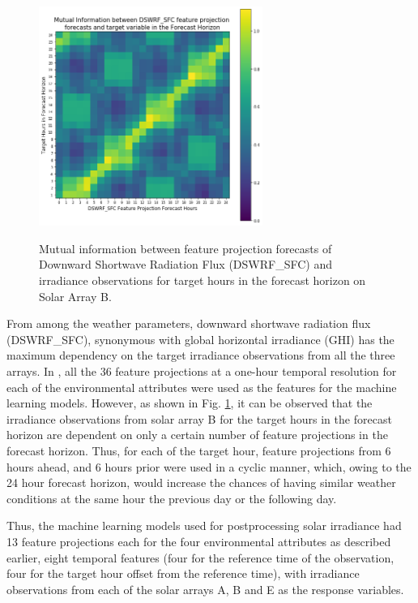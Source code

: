 \begin{figure}[htbp]
    \begin{center}
    	\includegraphics[width=0.65\textwidth]{chapter3/fig_mi_forecast_target.png}
    	\label{fig:fig_mi_forecast_target}
    	\caption[Mutual information between Downward Shortwave Radiation Flux feature projection forecasts and irradiance observations for target hours in the forecast horizon from Solar Array B]{Mutual information between feature projection forecasts of Downward Shortwave Radiation Flux (DSWRF\_SFC) and irradiance observations for target hours in the forecast horizon on Solar Array B.}
    \end{center}
\end{figure}

From among the weather parameters, downward shortwave radiation flux (DSWRF\_SFC), synonymous with global horizontal irradiance (GHI) has the maximum dependency on the target irradiance observations from all the three arrays. In \cite{thesis_zach}, all the 36 feature projections at a one-hour temporal resolution for each of the environmental attributes were used as the features for the machine learning models. However, as shown in Fig. \ref{fig:fig_mi_forecast_target}, it can be observed that the irradiance observations from solar array B for the target hours in the forecast horizon are dependent on only a certain number of feature projections in the forecast horizon. Thus, for each of the target hour, feature projections from 6 hours ahead, and 6 hours prior were used in a cyclic manner, which, owing to the 24 hour forecast horizon, would increase the chances of having similar weather conditions at the same hour the previous day or the following day.

Thus, the machine learning models used for postprocessing solar irradiance had 13 feature projections each for the four environmental attributes as described earlier, eight temporal features (four for the reference time of the observation, four for the target hour offset from the reference time), with irradiance observations from each of the solar arrays A, B and E as the response variables. 




